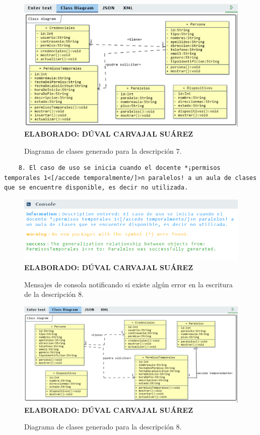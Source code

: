  \begin{figure}[H]
 	\caption{Diagrama de clases generado para la descripción 7.}
 	\includegraphics[width=15cm]{img/dc-eva-007.png}
 	\label{fig:dc_eva_007}
 	\textbf{\\ ELABORADO: DÚVAL CARVAJAL SUÁREZ}
 \end{figure}
 
 \begin{lstlisting}
 	8. El caso de uso se inicia cuando el docente *¡permisos temporales 1<[/accede temporalmente/]>n paralelos! a un aula de clases que se encuentre disponible, es decir no utilizada.
 \end{lstlisting}

     \begin{figure}[h!]
	\caption{Mensajes de consola notificando si existe algún error en la escritura de la descripción 8.}
	\includegraphics[width=14cm]{img/not-eva-008.png}
	\label{fig:not_eva_008}
	\textbf{\\ ELABORADO: DÚVAL CARVAJAL SUÁREZ}
\end{figure}

\begin{figure}[H]
	\caption{Diagrama de clases generado para la descripción 8.}
	\includegraphics[width=15cm]{img/dc-eva-008.png}
	\label{fig:dc_eva_008}
	\textbf{\\ ELABORADO: DÚVAL CARVAJAL SUÁREZ}
\end{figure}

